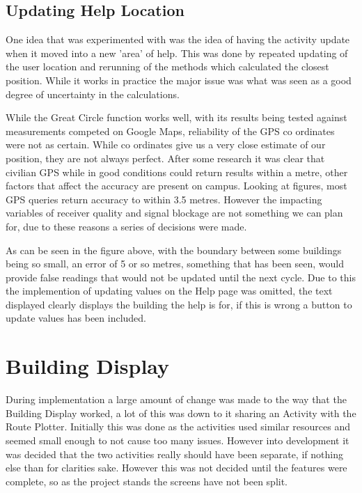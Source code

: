 \subsection{Updating Help Location}
One idea that was experimented with was the idea of having the activity update when it moved into a new 'area' of help. This was done by repeated updating of the user location and rerunning of the methods which calculated the closest position. While it works in practice the major issue was what was seen as a good degree of uncertainty in the calculations.

While the Great Circle function works well, with its results being tested against measurements competed on Google Maps, reliability of the GPS co ordinates were not as certain. While co ordinates give us a very close estimate of our position, they are not always perfect. After some research it was clear that civilian GPS while in good conditions could return results within a metre, other factors that affect the accuracy are present on campus. Looking at figures, most GPS queries return accuracy to within 3.5 metres. However the impacting variables of receiver quality and signal blockage are not something we can plan for, due to these reasons a series of decisions were made.

As can be seen in the figure above, with the boundary between some buildings being so small, an error of 5 or so metres, something that has been seen, would provide false readings that would not be updated until the next cycle. Due to this the implemention of updating values on the Help page was omitted, the text displayed clearly displays the building the help is for, if this is wrong  a button to update values has been included.  

\section{Building Display}
During implementation a large amount of change was made to the way that the Building Display worked, a lot of this was down to it sharing an Activity with the Route Plotter. Initially this was done as the activities used similar resources and seemed small enough to not cause too many issues. However into development it was decided that the two activities really should have been separate, if nothing else than for clarities sake. However this was not decided until the features were complete, so as the project stands the screens have not been split. 

